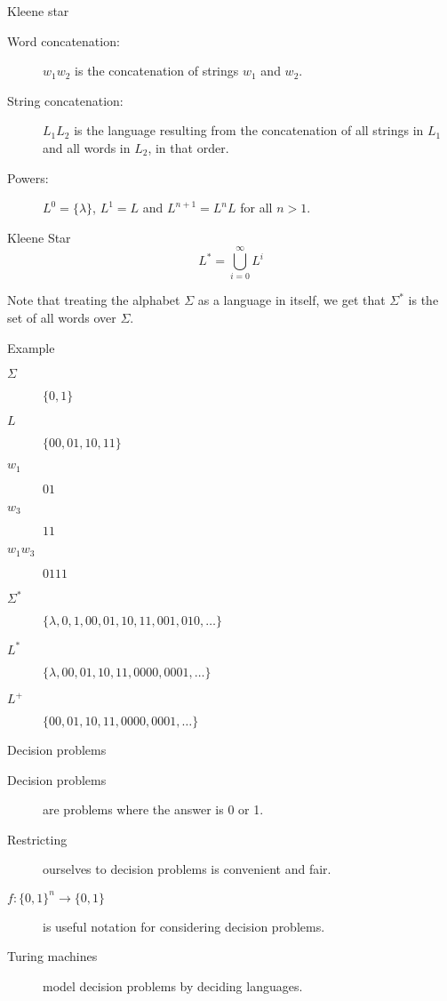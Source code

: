 \begin{frame}{Kleene star}
  \begin{description}
    \item[Word concatenation:] $w_1 w_2$ is the concatenation of strings $w_1$ and $w_2$.
    \item[String concatenation:] $L_1 L_2$ is the language resulting from the concatenation of all strings in $L_1$ and all words in $L_2$, in that order.
    \item[Powers:] $L^0 = \{ \lambda \}$, $L^1 = L$ and $L^{n+1} = L^n L$ for all $n > 1$.
  \end{description}
  \vspace{0.5cm}
  \begin{block}{Kleene Star}
     \[ L^* =  \bigcup_{i=0}^{\infty} L^i \]
  \end{block}
  Note that treating the alphabet $\Sigma$ as a language in itself, we get that $\Sigma^*$ is the set of all words over $\Sigma$.
\end{frame}


\begin{frame}{Example}
  \begin{description}
    \item[$\Sigma$] $\{ 0, 1 \}$
    \item[$L$] $\{ 00, 01, 10, 11 \}$
    \item[$w_1$] $01$
    \item[$w_3$] $11$
    \item[$w_1 w_3$] $0111$
    \item[$\Sigma^*$] $\{ \lambda, 0, 1, 00, 01, 10, 11, 001, 010, \ldots \}$
    \item[$L^*$] $\{ \lambda, 00, 01, 10, 11, 0000, 0001, \ldots \}$
    \item[$L^+$] $\{ 00, 01, 10, 11, 0000, 0001, \ldots \}$
  \end{description}
\end{frame}


\begin{frame}{Decision problems}
  \begin{description}
    \item[Decision problems] are problems where the answer is 0 or 1.
    \vspace{0.5cm}
    \item[Restricting] ourselves to decision problems is convenient and fair.
    \vspace{0.5cm}
    \item[$f:\{0,1\}^n \rightarrow \{0,1\}$] is useful notation for considering decision problems.
    \vspace{0.5cm}
    \item[Turing machines] model decision problems by deciding languages.
  \end{description}
\end{frame}


